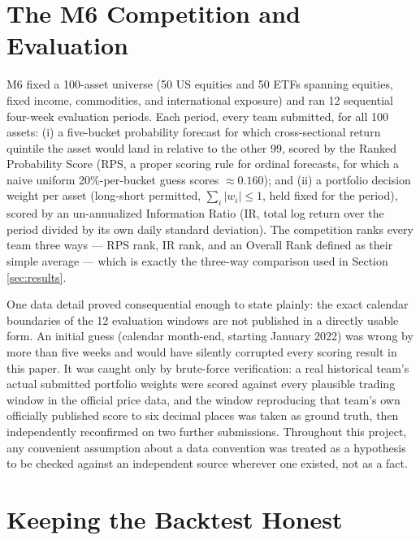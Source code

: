 \documentclass[11pt]{article}
\begin{document}
\section{The M6 Competition and Evaluation}
\label{sec:m6}

M6 \citep{makridakis2024} fixed a 100-asset universe (50 US equities and
50 ETFs spanning equities, fixed income, commodities, and international
exposure) and ran 12 sequential four-week evaluation periods. Each
period, every team submitted, for all 100 assets: (i) a five-bucket
probability forecast for which cross-sectional return quintile the asset
would land in relative to the other 99, scored by the Ranked Probability
Score (RPS, a proper scoring rule for ordinal forecasts, for which a
naive uniform 20\%-per-bucket guess scores $\approx 0.160$); and (ii) a
portfolio decision weight per asset (long-short permitted,
$\sum_i|w_i|\le 1$, held fixed for the period), scored by an
un-annualized Information Ratio (IR, total log return over the period
divided by its own daily standard deviation). The competition ranks
every team three ways --- RPS rank, IR rank, and an Overall Rank defined
as their simple average --- which is exactly the three-way comparison
used in Section \ref{sec:results}.

One data detail proved consequential enough to state plainly: the exact
calendar boundaries of the 12 evaluation windows are not published in a
directly usable form. An initial guess (calendar month-end, starting
January 2022) was wrong by more than five weeks and would have silently
corrupted every scoring result in this paper. It was caught only by
brute-force verification: a real historical team's actual submitted
portfolio weights were scored against every plausible trading window in
the official price data, and the window reproducing that team's own
officially published score to six decimal places was taken as ground
truth, then independently reconfirmed on two further submissions.
Throughout this project, any convenient assumption about a data
convention was treated as a hypothesis to be checked against an
independent source wherever one existed, not as a fact.

\section{Keeping the Backtest Honest}
\label{sec:realtime}
\end{document}
